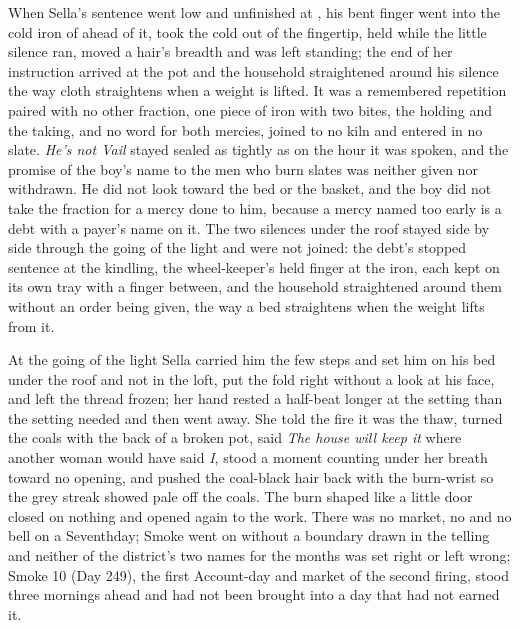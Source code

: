 When Sella's sentence went low and unfinished at , his bent finger went into the cold iron of  ahead of it, took the cold out of the fingertip, held while the little silence ran, moved a hair's breadth and was left standing; the end of her instruction arrived at the pot and the household straightened around his silence the way cloth straightens when a weight is lifted. It was a remembered repetition paired with no other fraction, one piece of iron with two bites, the holding and the taking, and no  word for both mercies, joined to no kiln and entered in no slate. \emph{He’s not Vail} stayed sealed as tightly as on the hour it was spoken, and the promise of the boy's name to the men who burn slates was neither given nor withdrawn. He did not look toward the bed or the basket, and the boy did not take the fraction for a mercy done to him, because a mercy named too early is a debt with a payer's name on it. The two silences under the roof stayed side by side through the going of the light and were not joined: the debt's stopped sentence at the kindling, the wheel-keeper's held finger at the iron, each kept on its own tray with a finger between, and the household straightened around them without an order being given, the way a bed straightens when the weight lifts from it.

\scenebreak

At the going of the light Sella carried him the few steps and set him on his bed under the roof and not in the loft, put the fold right without a look at his face, and left the thread frozen; her hand rested a half-beat longer at the setting than the setting needed and then went away. She told the fire it was the thaw, turned the coals with the back of a broken pot, said \emph{The house will keep it} where another woman would have said \emph{I}, stood a moment counting under her breath toward no opening, and pushed the coal-black hair back with the burn-wrist so the grey streak showed pale off the coals. The burn shaped like a little door closed on nothing and opened again to the work. There was no market, no  and no bell on a Seventhday; Smoke went on without a boundary drawn in the telling and neither of the district's two names for the months was set right or left wrong; Smoke 10 (Day 249), the first Account-day and market of the second firing, stood three mornings ahead and had not been brought into a day that had not earned it.

